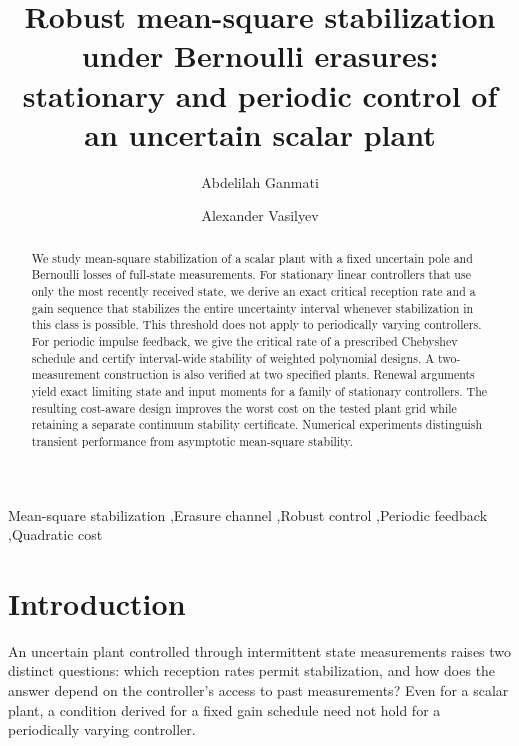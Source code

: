 \documentclass[preprint,12pt,numbers]{elsarticle}
\theoremstyle{definition}
\begin{document}
\begin{frontmatter}
\title{Robust mean-square stabilization under Bernoulli erasures: stationary and periodic control of an uncertain scalar plant}
\author[uiz]{Abdelilah Ganmati}
\author[bnbu]{Alexander Vasilyev}
\address[uiz]{LabSIV, Faculty of Sciences, Ibn Zohr University, Agadir, Morocco}
\address[bnbu]{Institute for Advanced Study, Beijing Normal-Hong Kong Baptist University, Zhuhai, Guangdong, China}
\begin{abstract}
We study mean-square stabilization of a scalar plant with a fixed uncertain pole and Bernoulli losses of full-state measurements. For stationary linear controllers that use only the most recently received state, we derive an exact critical reception rate and a gain sequence that stabilizes the entire uncertainty interval whenever stabilization in this class is possible. This threshold does not apply to periodically varying controllers. For periodic impulse feedback, we give the critical rate of a prescribed Chebyshev schedule and certify interval-wide stability of weighted polynomial designs. A two-measurement construction is also verified at two specified plants. Renewal arguments yield exact limiting state and input moments for a family of stationary controllers. The resulting cost-aware design improves the worst cost on the tested plant grid while retaining a separate continuum stability certificate. Numerical experiments distinguish transient performance from asymptotic mean-square stability.
\end{abstract}
\begin{keyword}
Mean-square stabilization \sep Erasure channel \sep Robust control \sep Periodic feedback \sep Quadratic cost
\end{keyword}
\end{frontmatter}

\section{Introduction}
An uncertain plant controlled through intermittent state measurements raises two distinct questions: which reception rates permit stabilization, and how does the answer depend on the controller's access to past measurements? Even for a scalar plant, a condition derived for a fixed gain schedule need not hold for a periodically varying controller.
\end{document}
